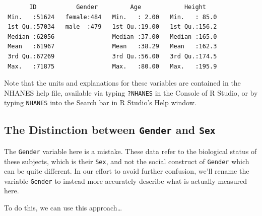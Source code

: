\documentclass[
]{book}
\newenvironment{Shaded}{\begin{snugshade}}{\end{snugshade}}
\newcommand{\DataTypeTok}[1]{\textcolor[rgb]{0.13,0.29,0.53}{#1}}
\newcommand{\KeywordTok}[1]{\textcolor[rgb]{0.13,0.29,0.53}{\textbf{#1}}}
\newcommand{\NormalTok}[1]{#1}
\newcommand{\OperatorTok}[1]{\textcolor[rgb]{0.81,0.36,0.00}{\textbf{#1}}}
\newcommand{\StringTok}[1]{\textcolor[rgb]{0.31,0.60,0.02}{#1}}
\begin{document}
\begin{Shaded}
\end{Shaded}

\begin{verbatim}
       ID           Gender         Age            Height     
 Min.   :51624   female:484   Min.   : 2.00   Min.   : 85.0  
 1st Qu.:57034   male  :479   1st Qu.:19.00   1st Qu.:156.2  
 Median :62056                Median :37.00   Median :165.0  
 Mean   :61967                Mean   :38.29   Mean   :162.3  
 3rd Qu.:67269                3rd Qu.:56.00   3rd Qu.:174.5  
 Max.   :71875                Max.   :80.00   Max.   :195.9  
\end{verbatim}

Note that the units and explanations for these variables are contained in the NHANES help file, available via typing \texttt{?NHANES} in the Console of R Studio, or by typing \texttt{NHANES} into the Search bar in R Studio's Help window.

\hypertarget{the-distinction-between-gender-and-sex}{%
\subsection{\texorpdfstring{The Distinction between \texttt{Gender} and \texttt{Sex}}{The Distinction between Gender and Sex}}\label{the-distinction-between-gender-and-sex}}

The \texttt{Gender} variable here is a mistake. These data refer to the biological status of these subjects, which is their \texttt{Sex}, and not the social construct of \texttt{Gender} which can be quite different. In our effort to avoid further confusion, we'll rename the variable \texttt{Gender} to instead more accurately describe what is actually measured here.

To do this, we can use this approach\ldots{}

\begin{Shaded}
\end{Shaded}
\end{document}
